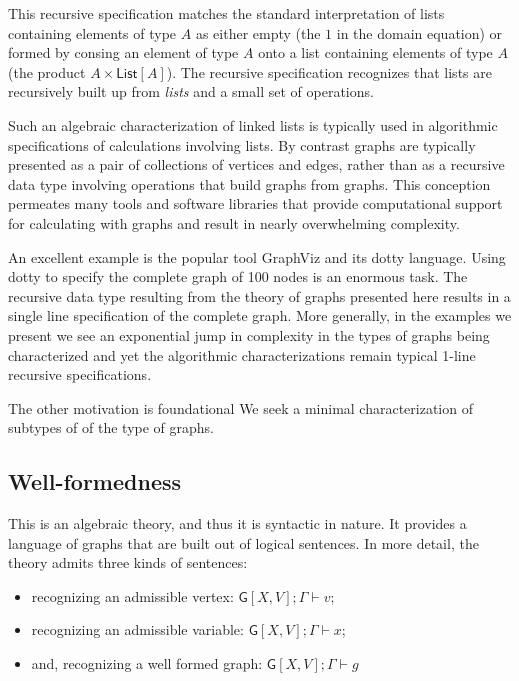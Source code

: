\documentclass[12pt]{llncs}
\begin{document}
This recursive specification matches the standard interpretation of
lists containing elements of type \(A\) as either empty (the \(1\) in
the domain equation) or formed by consing an element of type \(A\) onto
a list containing elements of type \(A\) (the product
\(A \times \mathsf{List}[A]\)). The recursive specification recognizes
that lists are recursively built up from \emph{lists} and a small set of
operations.

Such an algebraic characterization of linked lists is typically used in
algorithmic specifications of calculations involving lists. By contrast
graphs are typically presented as a pair of collections of vertices and
edges, rather than as a recursive data type involving operations that
build graphs from graphs. This conception permeates many tools and
software libraries that provide computational support for calculating
with graphs and result in nearly overwhelming complexity.

An excellent example is the popular tool GraphViz and its dotty
language. Using dotty to specify the complete graph of 100 nodes is an
enormous task. The recursive data type resulting from the theory of
graphs presented here results in a single line specification of the
complete graph. More generally, in the examples we present we see an
exponential jump in complexity in the types of graphs being
characterized and yet the algorithmic characterizations remain typical
1-line recursive specifications.

The other motivation is foundational We seek a minimal characterization
of subtypes of of the type of graphs.

\hypertarget{well-formedness}{%
\subsection{Well-formedness}\label{well-formedness}}

This is an algebraic theory, and thus it is syntactic in nature. It
provides a language of graphs that are built out of logical sentences.
In more detail, the theory admits three kinds of sentences:

\begin{itemize}
\item
  recognizing an admissible vertex:
  \(\mathsf{G}[X,V]; \Gamma \vdash v\);
\item
  recognizing an admissible variable:
  \(\mathsf{G}[X,V]; \Gamma \vdash x\);
\item
  and, recognizing a well formed graph:
  \(\mathsf{G}[X,V]; \Gamma \vdash g\)
\end{itemize}
\end{document}
